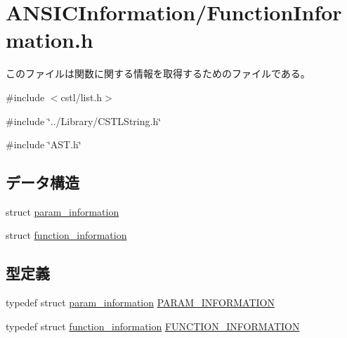 \section{ANSICInformation/FunctionInformation.h}
\label{FunctionInformation_8h}


このファイルは関数に関する情報を取得するためのファイルである。  


{\ttfamily \#include $<$cstl/list.h$>$}\par
{\ttfamily \#include \char`\"{}../Library/CSTLString.h\char`\"{}}\par
{\ttfamily \#include \char`\"{}AST.h\char`\"{}}\par
\subsection*{データ構造}
\begin{DoxyCompactItemize}
\item 
struct \hyperlink{structparam__information}{param\_\-information}
\item 
struct \hyperlink{structfunction__information}{function\_\-information}
\end{DoxyCompactItemize}
\subsection*{型定義}
\begin{DoxyCompactItemize}
\item 
typedef struct \hyperlink{structparam__information}{param\_\-information} \hyperlink{FunctionInformation_8h_ae4491ef8fff9eec21ce52d12bc035b04}{PARAM\_\-INFORMATION}
\item 
typedef struct \hyperlink{structfunction__information}{function\_\-information} \hyperlink{FunctionInformation_8h_aab4e23ad10f5b3c5e209289dbb41df40}{FUNCTION\_\-INFORMATION}
\end{DoxyCompactItemize}
